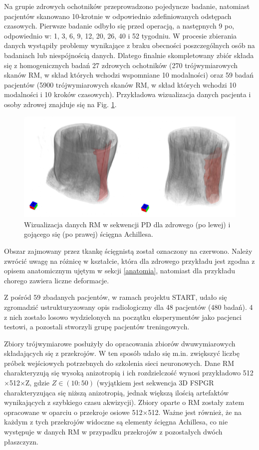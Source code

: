 Na grupie zdrowych ochotników przeprowadzono pojedyncze badanie, natomiast pacjentów skanowano 10-krotnie w odpowiednio zdefiniowanych odstępach czasowych. Pierwsze badanie odbyło się przed operacją, a następnych 9 po, odpowiednio w: 1, 3, 6, 9, 12, 20, 26, 40 i 52 tygodniu. W procesie zbierania danych wystąpiły problemy wynikające z braku obecności poszczególnych osób na badaniach lub niespójnością danych. Dlatego finalnie skompletowany zbiór składa się z homogenicznych badań 27 zdrowych ochotników (270 trójwymiarowych skanów RM, w skład których wchodzi wspomniane 10 modalności) oraz 59 badań pacjentów (5900 trójwymiarowych skanów RM, w skład których wchodzi 10 modalności i 10 kroków czasowych). Przykładowa wizualizacja danych pacjenta i osoby zdrowej znajduje się na Fig. \ref{fig:MRI_sample}. 
\begin{figure}[h!]
	\includegraphics[width=\textwidth]{figures/Data_MRI_sample.png}
	\caption{Wizualizacja danych RM w sekwencji PD dla zdrowego (po lewej) i gojącego się (po prawej) ścięgna Achillesa.}
	 \label{fig:MRI_sample}
\end{figure}
Obszar zajmowany przez tkankę ścięgnistą został oznaczony na czerwono. Należy zwrócić uwagę na różnicę w kształcie, która dla zdrowego przykładu jest zgodna z opisem anatomicznym ujętym w sekcji \ref{anatomia}, natomiast dla przykładu chorego zawiera liczne deformacje. 

Z pośród 59 zbadanych pacjentów, w ramach projektu START, udało się zgromadzić ustrukturyzowany opis radiologiczny dla 48 pacjentów (480 badań). 4 z nich zostało losowo wydzielonych na początku eksperymentów jako pacjenci testowi, a pozostali stworzyli grupę pacjentów treningowych.

Zbiory trójwymiarowe posłużyły do opracowania zbiorów dwuwymiarowych składających się z przekrojów. W ten sposób udało się m.in. zwiększyć liczbę próbek wejściowych potrzebnych do szkolenia sieci neuronowych. Dane RM charakteryzują się wysoką anizotropią i ich rozdzielczość wynosi przykładowo 512$\times$512$\times$Z, gdzie $Z\in(10:50)$ (wyjątkiem jest sekwencja 3D FSPGR charakteryzująca się niższą anizotropią, jednak większą ilością artefaktów wynikających z szybkiego czasu akwizycji). Zbiory oparte o RM zostały zatem opracowane w oparciu o przekroje osiowe 512$\times$512. Ważne jest również, że na każdym z tych przekrojów widoczne są elementy ścięgna Achillesa, co nie występuje w danych RM w przypadku przekrojów z pozostałych dwóch płaszczyzn.

